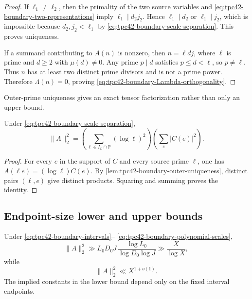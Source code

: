 \begin{proof}
If \(\ell_1\ne\ell_2\), then the primality of the two source variables
and \eqref{eq:tpc42-boundary-two-representations} imply
\(\ell_1\mid d_2j_2\).  Hence \(\ell_1\mid d_2\) or
\(\ell_1\mid j_2\), which is impossible because
\(d_2,j_2<\ell_1\) by
\eqref{eq:tpc42-boundary-scale-separation}.  This proves uniqueness.

If a summand contributing to \(A(n)\) is nonzero, then
\(n=\ell d j\), where \(\ell\) is prime and \(d\ge2\) with
\(\mu(d)\ne0\).  Any prime \(p\mid d\) satisfies
\(p\le d<\ell\), so \(p\ne\ell\).  Thus \(n\) has at least two
distinct prime divisors and is not a prime power.  Therefore
\(\Lambda(n)=0\), proving
\eqref{eq:tpc42-boundary-Lambda-orthogonality}.
\end{proof}

Outer-prime uniqueness gives an exact tensor factorization rather than
only an upper bound.

\begin{proposition}
\label{prop:tpc42-boundary-energy-factorization}
Under \eqref{eq:tpc42-boundary-scale-separation},
\begin{equation}
 \boxed{
 \|A\|_2^2
 =\left(
   \sum_{\ell\in I_L\cap\mathbb P}(\log\ell)^2
  \right)
  \left(
   \sum_e|C(e)|^2
  \right).}
 \label{eq:tpc42-boundary-energy-factorization}
\end{equation}
\end{proposition}

\begin{proof}
For every \(e\) in the support of \(C\) and every source prime
\(\ell\), one has
\(A(\ell e)=(\log\ell)C(e)\).  By
\cref{lem:tpc42-boundary-outer-uniqueness}, distinct pairs
\((\ell,e)\) give distinct products.  Squaring and summing proves the
identity.
\end{proof}

\subsection{Endpoint-size lower and upper bounds}

\begin{theorem}
\label{thm:tpc42-boundary-quantitative-energy}
Under \eqref{eq:tpc42-boundary-intervals}--
\eqref{eq:tpc42-boundary-polynomial-scales},
\begin{equation}
 \|A\|_2^2
 \gg
 L_0D_0J\,
 \frac{\log L_0}{\log D_0\log J}
 \gg \frac{X}{\log X},
 \label{eq:tpc42-boundary-energy-lower}
\end{equation}
while
\begin{equation}
 \|A\|_2^2
 \ll X^{1+o(1)}.
 \label{eq:tpc42-boundary-energy-upper}
\end{equation}
The implied constants in the lower bound depend only on the fixed
interval endpoints.
\end{theorem}

